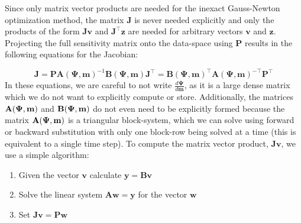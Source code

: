 \documentclass[preprint,review,3p,times,onecolumn,authoryear]{elsarticle}
\newcommand{\deriv}[2]{\frac{d #1}{d #2}}
\newcommand{\bfJ}{\mathbf{J}}
\newcommand{\bfP}{\mathbf{P}}
\newcommand{\bfm}{\mathbf{m}}
\newcommand{\bfv}{\mathbf{v}}
\newcommand{\bfw}{\mathbf{w}}
\newcommand{\bfy}{\mathbf{y}}
\newcommand{\bfz}{\mathbf{z}}
\newcommand{\bfPsi}{\boldsymbol{\Psi}}
\begin{document}
Since only matrix vector products are needed for the inexact Gauss-Newton optimization method, the  matrix $\bfJ$ is never needed explicitly and only the products of the form $\bfJ \bfv$ and $\bfJ^\top \bfz$ are needed for arbitrary vectors $\bfv$ and $\bfz$. Projecting the full sensitivity matrix onto the data-space using $\bfP$ results in the following equations for the Jacobian:

\begin{subequations}
\begin{equation}
\label{eq:richards-timestep-deriv-mult}
    \mathbf{J} = \mathbf{P} \mathbf{A}(\boldsymbol{\Psi},\mathbf{m})^{-1} \mathbf{B}(\boldsymbol{\Psi},\mathbf{m})
\end{equation}
\begin{equation}
\label{eq:richards-timestep-deriv-mult-adjoint}
    \mathbf{J}^\top =   \mathbf{B}(\boldsymbol{\Psi},\mathbf{m})^\top \mathbf{A}(\boldsymbol{\Psi},\mathbf{m})^{-\top} \mathbf{P}^\top
\end{equation}
\end{subequations}
In these equations, we are careful to not write $\deriv{\bfPsi}{\bfm}$, as it is a large dense matrix which we do not want to explicitly compute or store. Additionally, the matrices $\bf A(\bfPsi,\bfm)$ and $\bf B(\bfPsi,\bfm)$ do not even need to be explicitly formed because the matrix $\bf A(\bfPsi,\bfm)$ is a triangular block-system, which we can solve using forward or backward substitution with only one block-row being solved at a time (this is equivalent to a single time step). To compute the matrix vector product, $\bfJ \bfv$, we use a simple algorithm:

\begin{enumerate}
    \item Given the vector $\bfv$ calculate $\bfy = \mathbf{Bv}$
    \item Solve the linear system $\mathbf{Aw} = \bfy$ for the vector $\bfw$
    \item Set $\bfJ \bfv = \bfP \bfw$
\end{enumerate}
\end{document}
